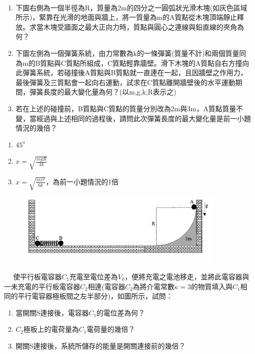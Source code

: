 \documentclass[cn,10pt,math=newtx,chinesefont=founder]{elegantbook}
\begin{document}
\begin{example}　
    \begin{enumerate}[label=(\arabic*)]
    \item 下圖右側為一個半徑為R，質量為2m的四分之一圓弧狀光滑木塊(如灰色區域所示)，緊靠在光滑的地面與牆上，將一質量為m的A質點從木塊頂端靜止釋放。求當木塊受牆面之最大正向力時，質點與圓心之連線與鉛直線的夾角為何？
    \item 下圖左側為一個彈簧系統，由力常數為k的一條彈簧(質量不計)和兩個質量同為m的B質點與C質點所組成，C質點輕靠牆壁。滑下木塊的A質點自右方撞向此彈簧系統，若碰撞後A質點與B質點就一直連在一起，且因牆壁之作用力，最後彈簧及三質點會一起向右運動，試求在C質點離開牆壁後的水平運動期間，彈簧長度的最大變化量為何？(以m,g,k,R表示之)
    \item 若在上述的碰撞前，B質點與C質點的質量分別改為2m與3m，A質點質量不變，當經過與上述相同的過程後，請問此次彈簧長度的最大變化量是前一小題情況的幾倍？
    \end{enumerate}
    
    \rightline{[3]}
\end{example}

\begin{solution}
\begin{enumerate}[label=(\arabic*)]
\item $45^o$
\item $x=\sqrt{\frac{mgR}{3k}}$
\item $x=\sqrt{\frac{mv^2}{6k}}$，為前一小題情況的1倍
\end{enumerate}
\end{solution}

\begin{figure}[htbp]
\flushright
\includegraphics[width=0.9\textwidth]{image/333.JPG}
\end{figure}

\newpage


\begin{example}　
    使平行板電容器$C_1$充電至電位差為$V_0$，便將充電之電池移走，並將此電容器與一未充電的平行板電容器$C_2$相連(電容器$C_2$為將介電常數$\kappa=3$的物質填入與$C_1$相同的平行電容器極板間之左半部分)，如圖所示，試問：
    \begin{enumerate}[label=(\arabic*)]
    \item 當開關S連接後，電容器$C_1$的電位差為何？
    \item $C_2$極板上的電荷量為$C_1$電荷量的幾倍？
    \item 開關S連接後，系統所儲存的能量是開關連接前的幾倍？
    \end{enumerate}
    
    \rightline{[4]}
\end{example}
\end{document}
